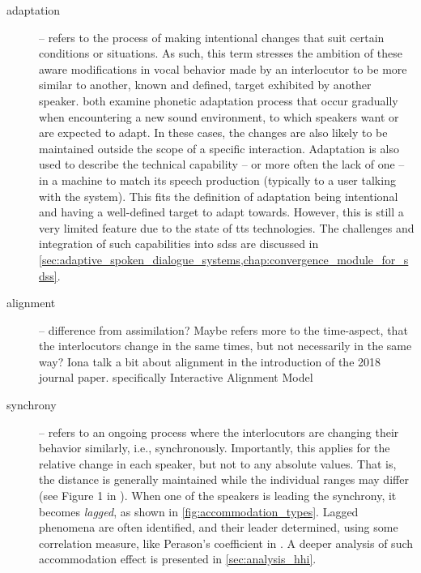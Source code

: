 \begin{description}
	\item[adaptation] -- refers to the process of making intentional changes that suit certain conditions or situations.
	As such, this term stresses the ambition of these aware modifications in vocal behavior made by an interlocutor to be more similar to another, known and defined, target exhibited by another speaker.
	\citet{Kang2010emergence, Hwang2015phonetic} both examine phonetic adaptation process that occur gradually when encountering a new sound environment, to which speakers want or are expected to adapt.
	In these cases, the changes are also likely to be maintained outside the scope of a specific interaction.
	Adaptation is also used to describe the technical capability -- or more often the lack of one -- in a machine to match its speech production (typically to a user talking with the system).
	This fits the definition of adaptation being intentional and having a well-defined target to adapt towards.
	However, this is still a very limited feature due to the state of \ac{tts} technologies.
	The challenges and integration of such capabilities into \acp{sds} are discussed in \cref{sec:adaptive_spoken_dialogue_systems,chap:convergence_module_for_sdss}.
	
	\item[alignment] -- difference from assimilation? Maybe refers more to the time-aspect, that the interlocutors change in the same times, but not necessarily in the same way? Iona talk a bit about alignment in the introduction of the 2018 journal paper.
	specifically Interactive Alignment Model \citep{Pickering2004behavioral}
	
	\item[synchrony] -- refers to an ongoing process where the interlocutors are changing their behavior similarly, i.e., synchronously.
	Importantly, this applies for the relative change in each speaker, but not to any absolute values.
	That is, the distance is generally maintained while the individual ranges may differ (see Figure 1 in \citet{Levitan2011measuring}).
	When one of the speakers is leading the synchrony, it becomes \emph{lagged}, as shown in \cref{fig:accommodation_types}.
	Lagged phenomena are often identified, and their leader determined, using some correlation measure, like Perason's coefficient in \citet{Edlund2009pause, Xia2014prosodic}.
	A deeper analysis of such accommodation effect is presented in \cref{sec:analysis_hhi}.
	

\end{description}
